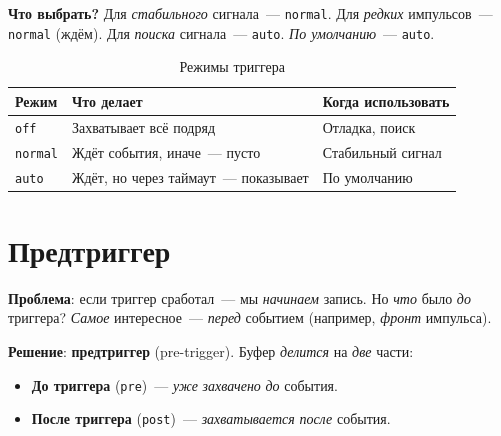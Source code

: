 \begin{keybox}
\textbf{Что выбрать?} Для \emph{стабильного} сигнала~---
\texttt{normal}. Для \emph{редких} импульсов~---
\texttt{normal} (ждём). Для \emph{поиска} сигнала~---
\texttt{auto}. \emph{По умолчанию}~--- \texttt{auto}.
\end{keybox}

\begin{table}[htbp]
\centering
\caption{Режимы триггера}
\label{tab:trigger-modes}
\small
\begin{tabularx}{\textwidth}{@{}l L L@{}}
\toprule
\textbf{Режим} & \textbf{Что делает} & \textbf{Когда использовать} \\
\midrule
\texttt{off}    & Захватывает всё подряд & Отладка, поиск \\
\texttt{normal} & Ждёт события, иначе~--- пусто & Стабильный сигнал \\
\texttt{auto}   & Ждёт, но через таймаут~--- показывает & По умолчанию \\
\bottomrule
\end{tabularx}
\end{table}

\section{Предтриггер}
\label{sec:trigger-pretrigger}

\textbf{Проблема}: если триггер сработал~--- мы \emph{начинаем}
запись. Но \emph{что} было \emph{до} триггера? \emph{Самое}
интересное~--- \emph{перед} событием (например, \emph{фронт}
импульса).

\textbf{Решение}: \textbf{предтриггер} (pre-trigger).
Буфер \emph{делится} на \emph{две} части:
\begin{itemize}
    \item \textbf{До триггера} (\texttt{pre})~--- \emph{уже}
          \emph{захвачено} \emph{до} события.
    \item \textbf{После триггера} (\texttt{post})~--- \emph{захватывается}
          \emph{после} события.
\end{itemize}

